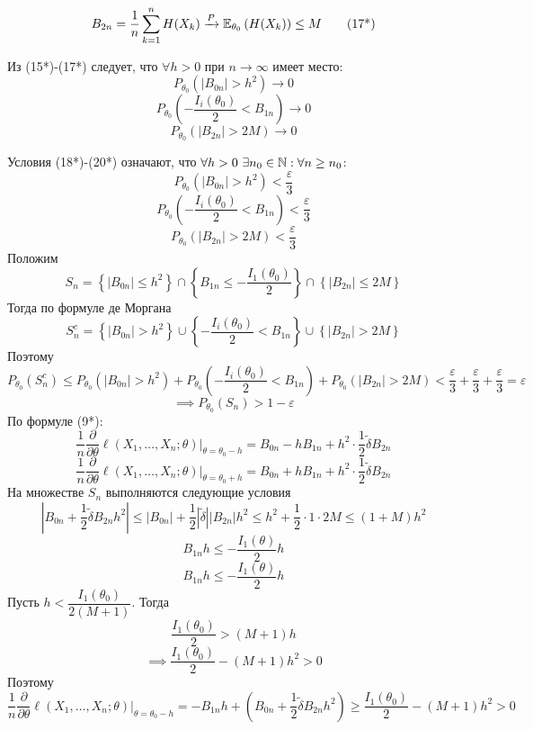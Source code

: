 {    \[B_{2n} = \frac{1}{n}\sum_{k=1}^{n}H(X_k) \xrightarrow{P} \mathbb{E}_{\theta_0}\left(H(X_k)\right) \leq M \tag{17*}\]

    Из (15*)-(17*) следует, что $\forall h > 0$ при $n \to \infty$ имеет место:
    \[P_{\theta_0}\left(|B_{0n}| > h^2\right) \to 0 \tag{18*}\]
    \[P_{\theta_0}\left(-\frac{I_i(\theta_0)}{2} < B_{1n}\right) \to 0 \tag{19*}\]
    \[P_{\theta_0}\left(|B_{2n}| > 2M\right) \to 0 \tag{20*}\]

    Условия (18*)-(20*) означают, что $\forall h >0\ \exists n_0 \in \mathbb{N}: \forall n \geq n_0$:
    \[P_{\theta_0}\left(|B_{0n}| > h^2\right) < \frac{\varepsilon}{3} \tag{21*}\]
    \[P_{\theta_0}\left(-\frac{I_i(\theta_0)}{2} < B_{1n}\right) < \frac{\varepsilon}{3} \tag{22*}\]
    \[P_{\theta_0}\left(|B_{2n}| > 2M\right) < \frac{\varepsilon}{3} \tag{23*}\]
    Положим
    \[S_n = \left\{|B_{0n}| \leq h^2\right\} \cap \left\{B_{1n} \leq -\frac{I_1(\theta_0)}{2}\right\} \cap \left\{|B_{2n}| \leq 2M\right\}\]
    Тогда по формуле де Моргана
    \[S_n^c = \left\{|B_{0n}| > h^2\right\} \cup \left\{-\frac{I_i(\theta_0)}{2} < B_{1n}\right\} \cup \left\{|B_{2n}| > 2M\right\}\]
    Поэтому
    \[P_{\theta_0}\left(S_n^c\right) \leq P_{\theta_0}\left(|B_{0n}| > h^2\right) + P_{\theta_0}\left(-\frac{I_i(\theta_0)}{2} < B_{1n}\right) + P_{\theta_0}\left(|B_{2n}| > 2M\right) < \frac{\varepsilon}{3} + \frac{\varepsilon}{3} + \frac{\varepsilon}{3} = \varepsilon \tag{24*}\]
    \[\implies P_{\theta_0}(S_n) > 1 - \varepsilon\]
    По формуле (9*):
    \[\frac{1}{n}\frac{\partial}{\partial\theta}\ell(X_1,\dots,X_n;\theta)\Bigg|_{\theta=\theta_0-h} = B_{0n} - hB_{1n} + h^2\cdot\frac{1}{2}\widetilde{\delta}B_{2n} \tag{25*}\]
    \[\frac{1}{n}\frac{\partial}{\partial\theta}\ell(X_1,\dots,X_n;\theta)\Bigg|_{\theta=\theta_0+h} = B_{0n} + hB_{1n} + h^2\cdot\frac{1}{2}\widetilde{\delta}B_{2n} \tag{26*}\]
    На множестве $S_n$ выполняются следующие условия
    \[\left|B_{0n} + \frac{1}{2}\widetilde{\delta}B_{2n}h^2\right| \leq |B_{0n}| + \frac{1}{2}\left|\widetilde{\delta}\right||B_{2n}|h^2 \leq h^2 + \frac{1}{2} \cdot 1 \cdot 2M \leq (1 + M)h^2 \tag{27*}\]
    \[B_{1n}h \leq -\frac{I_1(\theta)}{2}h \tag{28*}\]
    \[B_{1n}h \leq -\frac{I_1(\theta)}{2}h\tag{29*}\]
    Пусть $h < \dfrac{I_1(\theta_0)}{2(M+1)}$. Тогда
    \[\frac{I_1(\theta_0)}{2} > (M+1)h\]
    \[\implies \frac{I_1(\theta_0)}{2} - (M+1)h^2 > 0\tag{30*}\]
    Поэтому
    \[\frac{1}{n}\frac{\partial}{\partial\theta}\ell(X_1,\dots,X_n;\theta)\Bigg|_{\theta=\theta_0-h} = -B_{1n}h + \left(B_{0n} + \frac{1}{2}\widetilde{\delta}B_{2n}h^2\right) \geq \frac{I_1(\theta_0)}{2} - (M+1)h^2 > 0 \tag{31*}\]
}
